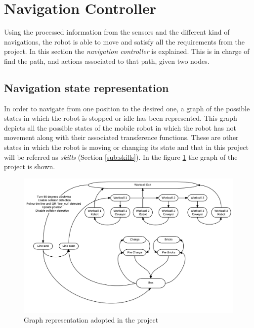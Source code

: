 \section{Navigation Controller} %
\label{sec:mr_navigation_controller}
Using the processed information from the sensors and the different kind of navigations, the robot is able to move and satisfy all the requirements from the project.
In this section the \emph{navigation controller} is explained.
This is in charge of find the path, and actions associated to that path, given two nodes.

\subsection{Navigation state representation} %
    \label{sub:mr_navigation_state_representation}
    In order to navigate from one position to the desired one, a graph of the possible states in which the robot is stopped or idle has been represented.
    This graph depicts all the possible states of the mobile robot in which the robot has not movement along with their associated transference functions. 
    These are other states in which the robot is moving or changing its state and that in this project will be referred as \emph{skills} (Section \ref{sub:skills}).
    In the figure \ref{fig:mr_graph} the graph of the project is shown.
    
    \begin{figure}[H]
        \centering
        \includegraphics[width=\textwidth]{figs/mr_graph.pdf}
        \caption{Graph representation adopted in the project}
        \label{fig:mr_graph}
    \end{figure}

